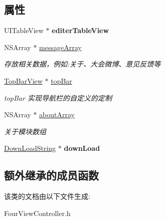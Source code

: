 \subsection*{属性}
\begin{DoxyCompactItemize}
\item 
\hypertarget{interface_four_view_controller_ac56bce5794079b0858b28bd5588f6ab4}{U\-I\-Table\-View $\ast$ {\bfseries editer\-Table\-View}}\label{interface_four_view_controller_ac56bce5794079b0858b28bd5588f6ab4}

\item 
\hypertarget{interface_four_view_controller_a8b7e1f75b33531d876d8c02c407a3c19}{N\-S\-Array $\ast$ \hyperlink{interface_four_view_controller_a8b7e1f75b33531d876d8c02c407a3c19}{message\-Array}}\label{interface_four_view_controller_a8b7e1f75b33531d876d8c02c407a3c19}

\begin{DoxyCompactList}\small\item\em 存放相关数据，例如\-:关于、大会微博、意见反馈等 \end{DoxyCompactList}\item 
\hypertarget{interface_four_view_controller_ad6ef698b571fc0d7a3c8818439de75dc}{\hyperlink{interface_top_bar_view}{Top\-Bar\-View} $\ast$ \hyperlink{interface_four_view_controller_ad6ef698b571fc0d7a3c8818439de75dc}{top\-Bar}}\label{interface_four_view_controller_ad6ef698b571fc0d7a3c8818439de75dc}

\begin{DoxyCompactList}\small\item\em top\-Bar 实现导航栏的自定义的定制 \end{DoxyCompactList}\item 
\hypertarget{interface_four_view_controller_ac5e0dcdc5771d39c5f162711111c013d}{N\-S\-Array $\ast$ \hyperlink{interface_four_view_controller_ac5e0dcdc5771d39c5f162711111c013d}{about\-Array}}\label{interface_four_view_controller_ac5e0dcdc5771d39c5f162711111c013d}

\begin{DoxyCompactList}\small\item\em 关于模块数组 \end{DoxyCompactList}\item 
\hypertarget{interface_four_view_controller_ad6d4e24ffabd33ee46a1a65ade7e4ab1}{\hyperlink{interface_down_load_string}{Down\-Load\-String} $\ast$ {\bfseries down\-Load}}\label{interface_four_view_controller_ad6d4e24ffabd33ee46a1a65ade7e4ab1}

\end{DoxyCompactItemize}
\subsection*{额外继承的成员函数}


该类的文档由以下文件生成\-:\begin{DoxyCompactItemize}
\item 
Four\-View\-Controller.\-h\end{DoxyCompactItemize}
